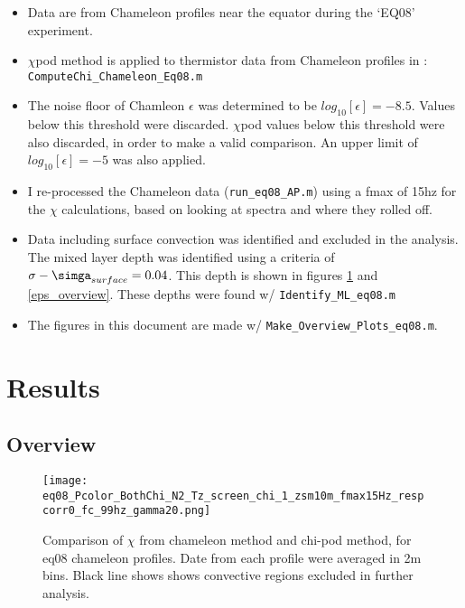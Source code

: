 \documentclass[11pt]{article}
\begin{document}
\begin{itemize}

\item Data are from Chameleon profiles near the equator during the `EQ08' experiment.

\item $\chi$pod method is applied to thermistor data from Chameleon profiles in : \verb+ComputeChi_Chameleon_Eq08.m+

\item The noise floor of Chamleon $\epsilon$ was determined to be $log_{10}[\epsilon]=-8.5$. Values below this threshold were discarded. $\chi$pod values below this threshold were also discarded, in order to make a valid comparison. An upper limit of $log_{10}[\epsilon]=-5$ was also applied.

\item I re-processed the Chameleon data (\verb+run_eq08_AP.m+) using a fmax of 15hz for the $\chi$ calculations, based on looking at spectra and where they rolled off.

\item Data including surface convection was identified and excluded in the analysis. The mixed layer depth was identified using a criteria of $\sigma -\simga_{surface}=0.04$. This depth is shown in figures \ref{chi_overview} and \ref{eps_overview}. These depths were found w/ \verb+Identify_ML_eq08.m+

\item  The figures in this document are made w/ \verb+Make_Overview_Plots_eq08.m+.

\end{itemize}




\clearpage
\section{Results}


\subsection{Overview}

\begin{figure}[htbp]
\texttt{[image: eq08\_Pcolor\_BothChi\_N2\_Tz\_screen\_chi\_1\_zsm10m\_fmax15Hz\_respcorr0\_fc\_99hz\_gamma20.png]}
\caption{Comparison of $\chi$ from chameleon method and chi-pod method, for eq08 chameleon profiles. Date from each profile were averaged in 2m bins.  Black line shows shows convective regions excluded in further analysis.}
\label{chi_overview}
\end{figure}
\end{document}
